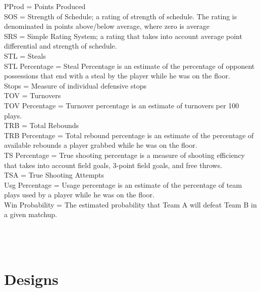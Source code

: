 \documentclass[journal,onecolumn]{IEEEtran}
\begin{document}
PProd = Points Produced\\
SOS = Strength of Schedule; a rating of strength of schedule. The rating is denominated in points above/below average, where zero is average\\
SRS = Simple Rating System; a rating that takes into account average point differential and strength of schedule. \\
STL = Steals \\
STL Percentage = Steal Percentage is an estimate of the percentage of opponent possessions that end with a steal by the player while he was on the floor.\\
Stops = Measure of individual defensive stops\\
TOV = Turnovers\\
TOV Percentage = Turnover percentage is an estimate of turnovers per 100 plays.\\
TRB = Total Rebounds\\
TRB Percentage = Total rebound percentage is an estimate of the percentage of available rebounds a player grabbed while he was on the floor.\\
TS Percentage = True shooting percentage is a measure of shooting efficiency that takes into account field goals, 3-point field goals, and free throws.\\
TSA = True Shooting Attempts\\
Usg Percentage = Usage percentage is an estimate of the percentage of team plays used by a player while he was on the floor.\\
Win Probability = The estimated probability that Team A will defeat Team B in a given matchup.\\
\\
\\
\\

\section{Designs}
\end{document}
